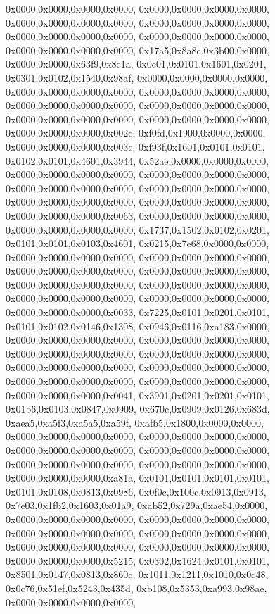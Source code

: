 {	0x0000,0x0000,0x0000,0x0000,
	0x0000,0x0000,0x0000,0x0000,
	0x0000,0x0000,0x0000,0x0000,
	0x0000,0x0000,0x0000,0x0000,
	0x0000,0x0000,0x0000,0x0000,
	0x0000,0x0000,0x0000,0x0000,
	0x0000,0x0000,0x0000,0x0000,
	0x17a5,0x8a8c,0x3b00,0x0000,
	0x0000,0x0000,0x63f9,0x8e1a,
	0x0e01,0x0101,0x1601,0x0201,
	0x0301,0x0102,0x1540,0x98af,
	0x0000,0x0000,0x0000,0x0000,
	0x0000,0x0000,0x0000,0x0000,
	0x0000,0x0000,0x0000,0x0000,
	0x0000,0x0000,0x0000,0x0000,
	0x0000,0x0000,0x0000,0x0000,
	0x0000,0x0000,0x0000,0x0000,
	0x0000,0x0000,0x0000,0x0000,
	0x0000,0x0000,0x0000,0x002c,
	0xf0fd,0x1900,0x0000,0x0000,
	0x0000,0x0000,0x0000,0x003c,
	0xf93f,0x1601,0x0101,0x0101,
	0x0102,0x0101,0x4601,0x3944,
	0x52ae,0x0000,0x0000,0x0000,
	0x0000,0x0000,0x0000,0x0000,
	0x0000,0x0000,0x0000,0x0000,
	0x0000,0x0000,0x0000,0x0000,
	0x0000,0x0000,0x0000,0x0000,
	0x0000,0x0000,0x0000,0x0000,
	0x0000,0x0000,0x0000,0x0000,
	0x0000,0x0000,0x0000,0x0063,
	0x0000,0x0000,0x0000,0x0000,
	0x0000,0x0000,0x0000,0x0000,
	0x1737,0x1502,0x0102,0x0201,
	0x0101,0x0101,0x0103,0x4601,
	0x0215,0x7e68,0x0000,0x0000,
	0x0000,0x0000,0x0000,0x0000,
	0x0000,0x0000,0x0000,0x0000,
	0x0000,0x0000,0x0000,0x0000,
	0x0000,0x0000,0x0000,0x0000,
	0x0000,0x0000,0x0000,0x0000,
	0x0000,0x0000,0x0000,0x0000,
	0x0000,0x0000,0x0000,0x0000,
	0x0000,0x0000,0x0000,0x0000,
	0x0000,0x0000,0x0000,0x0033,
	0x7225,0x0101,0x0201,0x0101,
	0x0101,0x0102,0x0146,0x1308,
	0x0946,0x0116,0xa183,0x0000,
	0x0000,0x0000,0x0000,0x0000,
	0x0000,0x0000,0x0000,0x0000,
	0x0000,0x0000,0x0000,0x0000,
	0x0000,0x0000,0x0000,0x0000,
	0x0000,0x0000,0x0000,0x0000,
	0x0000,0x0000,0x0000,0x0000,
	0x0000,0x0000,0x0000,0x0000,
	0x0000,0x0000,0x0000,0x0000,
	0x0000,0x0000,0x0000,0x0041,
	0x3901,0x0201,0x0201,0x0101,
	0x01b6,0x0103,0x0847,0x0909,
	0x670c,0x0909,0x0126,0x683d,
	0xaea5,0xa5f3,0xa5a5,0xa59f,
	0xafb5,0x1800,0x0000,0x0000,
	0x0000,0x0000,0x0000,0x0000,
	0x0000,0x0000,0x0000,0x0000,
	0x0000,0x0000,0x0000,0x0000,
	0x0000,0x0000,0x0000,0x0000,
	0x0000,0x0000,0x0000,0x0000,
	0x0000,0x0000,0x0000,0x0000,
	0x0000,0x0000,0x0000,0xa81a,
	0x0101,0x0101,0x0101,0x0101,
	0x0101,0x0108,0x0813,0x0986,
	0x0f0c,0x100c,0x0913,0x0913,
	0x7e03,0x1fb2,0x1603,0x01a9,
	0xab52,0x729a,0xae54,0x0000,
	0x0000,0x0000,0x0000,0x0000,
	0x0000,0x0000,0x0000,0x0000,
	0x0000,0x0000,0x0000,0x0000,
	0x0000,0x0000,0x0000,0x0000,
	0x0000,0x0000,0x0000,0x0000,
	0x0000,0x0000,0x0000,0x0000,
	0x0000,0x0000,0x0000,0x5215,
	0x0302,0x1624,0x0101,0x0101,
	0x8501,0x0147,0x0813,0x860c,
	0x1011,0x1211,0x1010,0x0c48,
	0x0c76,0x51ef,0x5243,0x435d,
	0xb108,0x5353,0xa993,0x98ae,
	0x0000,0x0000,0x0000,0x0000,
}
